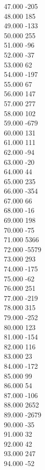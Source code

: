 { 47.000	-205 \\
 48.000	185 \\
 49.000	-133 \\
 50.000	255 \\
 51.000	-96 \\
 52.000	-37 \\
 53.000	62 \\
 54.000	-197 \\
 55.000	67 \\
 56.000	147 \\
 57.000	277 \\
 58.000	102 \\
 59.000	-679 \\
 60.000	131 \\
 61.000	111 \\
 62.000	-94 \\
 63.000	-20 \\
 64.000	44 \\
 65.000	235 \\
 66.000	-354 \\
 67.000	66 \\
 68.000	-16 \\
 69.000	198 \\
 70.000	-75 \\
 71.000	5366 \\
 72.000	-5579 \\
 73.000	293 \\
 74.000	-175 \\
 75.000	-62 \\
 76.000	251 \\
 77.000	-219 \\
 78.000	315 \\
 79.000	-252 \\
 80.000	123 \\
 81.000	-154 \\
 82.000	116 \\
 83.000	23 \\
 84.000	-172 \\
 85.000	99 \\
 86.000	54 \\
 87.000	-106 \\
 88.000	2652 \\
 89.000	-2679 \\
 90.000	-35 \\
 91.000	32 \\
 92.000	42 \\
 93.000	247 \\
 94.000	-52 \\
}
